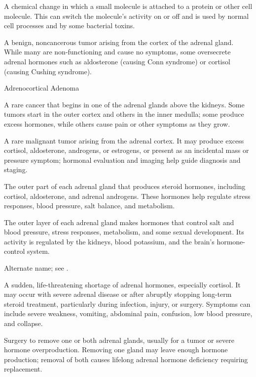  A chemical change in which a small molecule is attached to a protein or other cell molecule. This can switch the molecule’s activity on or off and is used by normal cell processes and by some bacterial toxins.

 A benign, noncancerous tumor arising from the cortex of the adrenal gland. While many are non-functioning and cause no symptoms, some oversecrete adrenal hormones such as aldosterone (causing Conn syndrome) or cortisol (causing Cushing syndrome).

\synonyms
Adrenocortical Adenoma

 A rare cancer that begins in one of the adrenal glands above the kidneys. Some tumors start in the outer cortex and others in the inner medulla; some produce excess hormones, while others cause pain or other symptoms as they grow.

 A rare malignant tumor arising from the adrenal cortex. It may produce excess cortisol, aldosterone, androgens, or estrogens, or present as an incidental mass or pressure symptom; hormonal evaluation and imaging help guide diagnosis and staging.

 The outer part of each adrenal gland that produces steroid hormones, including cortisol, aldosterone, and adrenal androgens. These hormones help regulate stress responses, blood pressure, salt balance, and metabolism.

 The outer layer of each adrenal gland makes hormones that control salt and blood pressure, stress responses, metabolism, and some sexual development. Its activity is regulated by the kidneys, blood potassium, and the brain’s hormone-control system.

 Alternate name; see .

 A sudden, life-threatening shortage of adrenal hormones, especially cortisol. It may occur with severe adrenal disease or after abruptly stopping long-term steroid treatment, particularly during infection, injury, or surgery. Symptoms can include severe weakness, vomiting, abdominal pain, confusion, low blood pressure, and collapse.

 Surgery to remove one or both adrenal glands, usually for a tumor or severe hormone overproduction. Removing one gland may leave enough hormone production; removal of both causes lifelong adrenal hormone deficiency requiring replacement.

